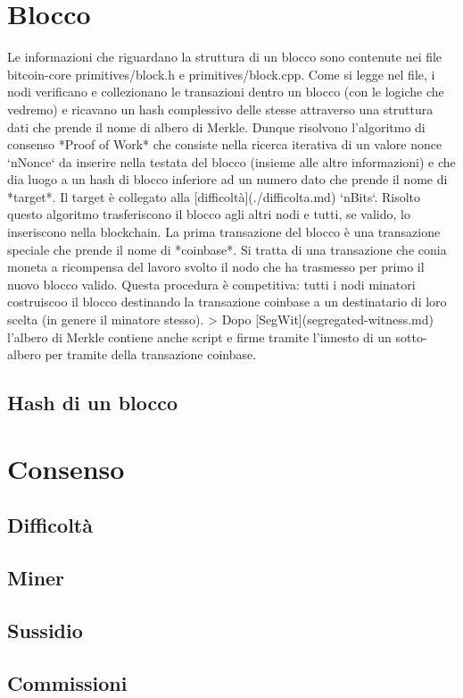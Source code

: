 \documentclass{book}
\theoremstyle{definition}
\begin{document}
\section{Blocco}
Le informazioni che riguardano la struttura di un blocco sono contenute nei file bitcoin-core primitives/block.h e primitives/block.cpp.
Come si legge nel file, i nodi verificano e collezionano le transazioni dentro un blocco (con le logiche che vedremo) e ricavano un hash complessivo delle stesse attraverso una struttura dati che prende il nome di albero di Merkle.
Dunque risolvono l'algoritmo di consenso *Proof of Work* che consiste nella ricerca iterativa di un valore nonce `nNonce` da inserire nella testata del blocco (insieme alle altre informazioni) e che dia luogo a un hash di blocco inferiore ad un numero dato che prende il nome di *target*. Il target è collegato alla [difficoltà](./difficolta.md) `nBits`.
Risolto questo algoritmo trasferiscono il blocco agli altri nodi e tutti, se valido, lo inseriscono nella blockchain. La prima transazione del blocco è una transazione speciale che prende il nome di *coinbase*. Si tratta di una transazione che conia moneta a ricompensa del lavoro svolto il nodo che ha trasmesso per primo il nuovo blocco valido. Questa procedura è competitiva: tutti i nodi minatori costruiscoo il blocco destinando la transazione coinbase a un destinatario di loro scelta (in genere il minatore stesso).
> Dopo [SegWit](segregated-witness.md) l'albero di Merkle contiene anche script e firme tramite l'innesto di un sotto-albero per tramite della transazione coinbase.

\subsection{Hash di un blocco}

\newpage
\section{Consenso}
\subsection{Difficoltà}
\subsection{Miner}
\subsection{Sussidio}
\subsection{Commissioni}
\end{document}
